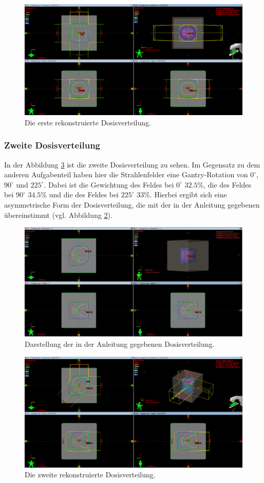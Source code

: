 \begin{figure}[H]
	\centering
	\includegraphics[width=0.7\linewidth]{../../Wasserphantom Bilder/ersteVerteilung.png}
	\caption{Die erste rekonstruierte Dosisverteilung.}
	\label{fig:ersteverteilung}
\end{figure}

\subsubsection{Zweite Dosisverteilung}
In der Abbildung \ref{fig:zweiteverteilung} ist die zweite Dosisverteilung zu sehen. Im Gegensatz zu dem anderen Aufgabenteil haben hier die Strahlenfelder eine Gantry-Rotation von $0^\circ$, $90^\circ$ und $225^\circ$. Dabei ist die Gewichtung des Feldes bei $0^\circ$ $32.5\%$, die des Feldes bei $90^\circ$ $34.5\%$ und die des Feldes bei $225^\circ$ $33\%$. Hierbei ergibt sich eine asymmetrische Form der Dosisverteilung, die mit der in der Anleitung gegebenen übereinstimmt (vgl. Abbildung \ref{abb:zweiteverteilung}).

\begin{figure}[H]
	\centering
	\includegraphics[width=0.7\linewidth]{../../Wasserphantom Bilder/AnleitungzweiteVerteilung.png}
	\caption{Darstellung der in der Anleitung gegebenen Dosisverteilung. \cite{Anleitung}}
	\label{abb:zweiteverteilung}
\end{figure}

\begin{figure}[H]
	\centering
	\includegraphics[width=0.7\linewidth]{../../Wasserphantom Bilder/zweiteVerteilung.png}
	\caption{Die zweite rekonstruierte Dosisverteilung.}
	\label{fig:zweiteverteilung}
\end{figure}

